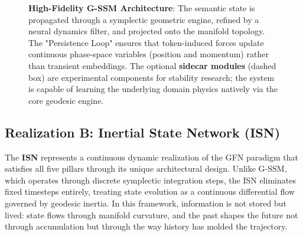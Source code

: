 \documentclass[12pt,a4paper]{article}
\begin{document}
\begin{figure}[!ht]
    \caption{\textbf{High-Fidelity G-SSM Architecture}: The semantic state is propagated through a symplectic geometric engine, refined by a neural dynamics filter, and projected onto the manifold topology. The "Persistence Loop" ensures that token-induced forces update continuous phase-space variables (position and momentum) rather than transient embeddings. The optional \textbf{sidecar modules} (dashed box) are experimental components for stability research; the system is capable of learning the underlying domain physics natively via the core geodesic engine.}
    \label{fig:tikz-gssm-detailed}
\end{figure}

\subsection{Realization B: Inertial State Network (ISN)}
\label{sec:reality-model}

The \textbf{ISN} represents a continuous dynamic realization of the GFN paradigm that satisfies all five pillars through its unique architectural design. Unlike G-SSM, which operates through discrete symplectic integration steps, the ISN eliminates fixed timesteps entirely, treating state evolution as a continuous differential flow governed by geodesic inertia. In this framework, information is not stored but lived: state flows through manifold curvature, and the past shapes the future not through accumulation but through the way history has molded the trajectory.
\end{document}
